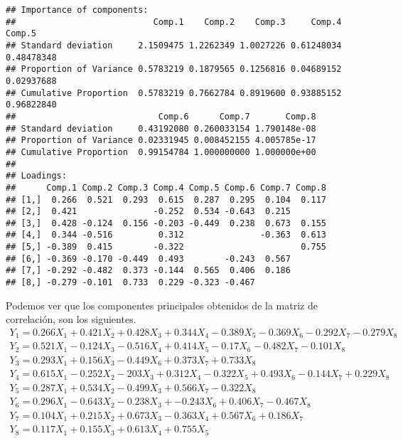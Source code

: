 \documentclass[]{article}
\begin{document}
\begin{verbatim}
## Importance of components:
##                           Comp.1    Comp.2    Comp.3     Comp.4     Comp.5
## Standard deviation     2.1509475 1.2262349 1.0027226 0.61248034 0.48478348
## Proportion of Variance 0.5783219 0.1879565 0.1256816 0.04689152 0.02937688
## Cumulative Proportion  0.5783219 0.7662784 0.8919600 0.93885152 0.96822840
##                            Comp.6      Comp.7       Comp.8
## Standard deviation     0.43192080 0.260033154 1.790148e-08
## Proportion of Variance 0.02331945 0.008452155 4.005785e-17
## Cumulative Proportion  0.99154784 1.000000000 1.000000e+00
## 
## Loadings:
##      Comp.1 Comp.2 Comp.3 Comp.4 Comp.5 Comp.6 Comp.7 Comp.8
## [1,]  0.266  0.521  0.293  0.615  0.287  0.295  0.104  0.117
## [2,]  0.421               -0.252  0.534 -0.643  0.215       
## [3,]  0.428 -0.124  0.156 -0.203 -0.449  0.238  0.673  0.155
## [4,]  0.344 -0.516         0.312               -0.363  0.613
## [5,] -0.389  0.415        -0.322                       0.755
## [6,] -0.369 -0.170 -0.449  0.493        -0.243  0.567       
## [7,] -0.292 -0.482  0.373 -0.144  0.565  0.406  0.186       
## [8,] -0.279 -0.101  0.733  0.229 -0.323 -0.467
\end{verbatim}

Podemos ver que los componentes principales obtenidos de la matriz de
correlación, son los siguientes. \[\begin{array}{l}
Y_{1} =  0.266X_{1} + 0.421X_{2}+ 0.428X_{3} + 0.344X_{4} - 0.389X_{5} - 0.369X_{6} - 0.292X_{7} - 0.279X_{8}\\
Y_{2} =  0.521X_{1} - 0.124X_{3} - 0.516X_{4} + 0.414X_{5} - 0.17X_{6} - 0.482X_{7} - 0.101X_{8}\\
Y_{3} =  0.293X_{1} + 0.156X_{3} - 0.449X_{6} + 0.373X_{7} + 0.733X_{8}\\
Y_{4} =  0.615X_{1} - 0.252X_{2} - 203X_{3} + 0.312X_{4} - 0.322X_{5} + 0.493X_{6} - 0.144X_{7} + 0.229X_{8}\\
Y_{5} =  0.287X_{1} + 0.534X_{2} - 0.499X_{3} + 0.566X_{7} -0.322X_{8} \\
Y_{6} =  0.296X_{1} - 0.643X_{2} - 0.238X_{3} + -0.243X_{6} + 0.406X_{7} - 0.467X_{8}\\
Y_{7} =  0.104X_{1} + 0.215X_{2} + 0.673X_{3} -  0.363X_{4} + 0.567X_{6} + 0.186X_{7}\\
Y_{8} =  0.117X_{1} + 0.155X_{3} +  0.613X_{4} + 0.755X_{5}\\
\end{array}\]
\end{document}
